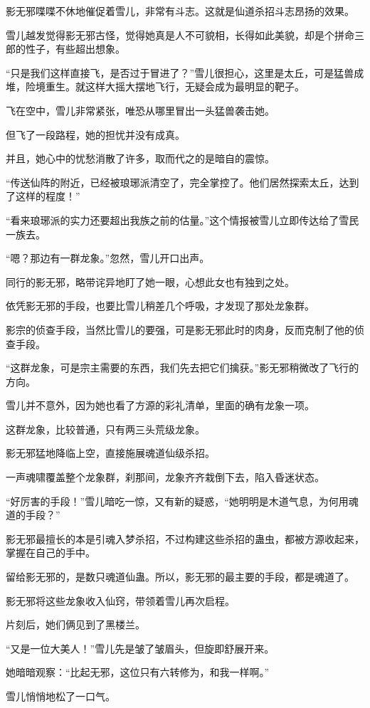 \begin{this_body}
影无邪喋喋不休地催促着雪儿，非常有斗志。这就是仙道杀招斗志昂扬的效果。

雪儿越发觉得影无邪古怪，觉得她真是人不可貌相，长得如此美貌，却是个拼命三郎的性子，有些超出想象。

“只是我们这样直接飞，是否过于冒进了？”雪儿很担心，这里是太丘，可是猛兽成堆，险境重生。就这样大摇大摆地飞行，无疑会成为最明显的靶子。

飞在空中，雪儿非常紧张，唯恐从哪里冒出一头猛兽袭击她。

但飞了一段路程，她的担忧并没有成真。

并且，她心中的忧愁消散了许多，取而代之的是暗自的震惊。

“传送仙阵的附近，已经被琅琊派清空了，完全掌控了。他们居然探索太丘，达到了这样的程度！”

“看来琅琊派的实力还要超出我族之前的估量。”这个情报被雪儿立即传达给了雪民一族去。

“嗯？那边有一群龙象。”忽然，雪儿开口出声。

同行的影无邪，略带诧异地盯了她一眼，心想此女也有独到之处。

依凭影无邪的手段，也要比雪儿稍差几个呼吸，才发现了那处龙象群。

影宗的侦查手段，当然比雪儿的要强，可是影无邪此时的肉身，反而克制了他的侦查手段。

“这群龙象，可是宗主需要的东西，我们先去把它们擒获。”影无邪稍微改了飞行的方向。

雪儿并不意外，因为她也看了方源的彩礼清单，里面的确有龙象一项。

这群龙象，比较普通，只有两三头荒级龙象。

影无邪猛地降临上空，直接施展魂道仙级杀招。

一声魂啸覆盖整个龙象群，刹那间，龙象齐齐栽倒下去，陷入昏迷状态。

“好厉害的手段！”雪儿暗吃一惊，又有新的疑惑，“她明明是木道气息，为何用魂道的手段？”

影无邪最擅长的本是引魂入梦杀招，不过构建这些杀招的蛊虫，都被方源收起来，掌握在自己的手中。

留给影无邪的，是数只魂道仙蛊。所以，影无邪的最主要的手段，都是魂道了。

影无邪将这些龙象收入仙窍，带领着雪儿再次启程。

片刻后，她们俩见到了黑楼兰。

“又是一位大美人！”雪儿先是皱了皱眉头，但旋即舒展开来。

她暗暗观察：“比起无邪，这位只有六转修为，和我一样啊。”

雪儿悄悄地松了一口气。

\end{this_body}

